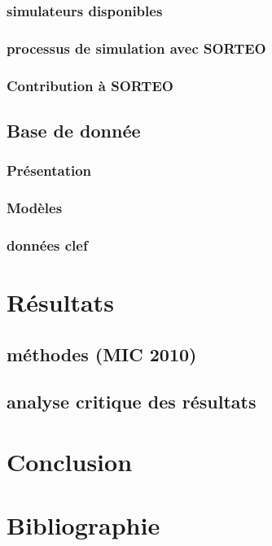 \documentclass[12pt]{book}
\begin{document}
		\section{simulateurs disponibles}
		\section{processus de simulation avec SORTEO}
		\section{Contribution à SORTEO}

	\chapter{Base de donnée}
		\section{Présentation}
		\section{Modèles}
		\section{données clef} %


\part{Résultats}
	\chapter{méthodes (MIC 2010)}
        \chapter{analyse critique des résultats}

\part{Conclusion}




\part{Bibliographie}


\end{document}
